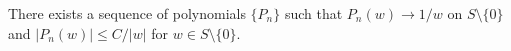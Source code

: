 
There exists a sequence of polynomials $\{P_n\}$ such that $P_n(w) \to 1/w$ on $S \setminus \{0\}$ and $|P_n(w)| \leq C/|w|$ for $w \in S \setminus \{0\}$.
